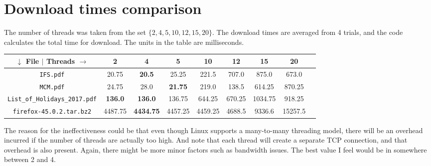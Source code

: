 \documentclass{article}
\begin{document}
\section*{Download times comparison}
\begin{flushleft}
The number of threads was taken from the set \(\{2, 4, 5, 10, 12, 15, 20\}\). The download times are averaged from 4 trials, and the code calculates the total time for download. The units in the table are milliseconds.
\begin{center}
\begin{tabular}{|c|c|c|c|c|c|c|c|c|}
\hline
\(\downarrow\) File \(\vert\) Threads \(\rightarrow\) & 2 & 4 & 5 & 10 & 12 & 15 & 20 \\
\hline
\hline
\texttt{IFS.pdf} & 20.75 & \textbf{20.5} & 25.25 & 221.5 & 707.0 & 875.0 & 673.0 \\
\hline
\texttt{MCM.pdf} & 24.75 & 28.0 & \textbf{21.75} & 219.0 & 138.5 & 614.25 & 870.25 \\
\hline
\texttt{List\_of\_Holidays\_2017.pdf} & \textbf{136.0} & \textbf{136.0} & 136.75 & 644.25 & 670.25 & 1034.75 & 918.25 \\
\hline
\texttt{firefox-45.0.2.tar.bz2} & 4487.75 & \textbf{4434.75} & 4457.25 & 4459.25 & 4688.5 & 9336.6 & 15257.5 \\
\hline
\end{tabular}
\end{center}

The reason for the ineffectiveness could be that even though Linux supports a many-to-many threading model, there will be an overhead incurred if the number of threads are actually too high. And note that each thread will create a separate TCP connection, and that overhead is also present. Again, there might be more minor factors such as bandwidth issues. The best value I feel would be in somewhere between 2 and 4.
\end{flushleft}
\end{document}
